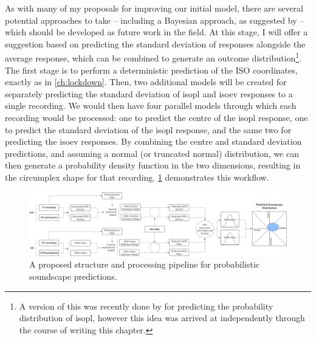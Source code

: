As with many of my proposals for improving our initial model, there are several potential approaches to take -- including a Bayesian approach, as suggested by \citet{Lionello2021Thesis} -- which should be developed as future work in the field. At this stage, I will offer a suggestion based on predicting the standard deviation of responses alongside the average response, which can be combined to generate an outcome distribution\footnote{A version of this was recently done by \citet{Ooi2022Probably} for predicting the probability distribution of \gls{isopl}, however this idea was arrived at independently through the course of writing this chapter.}. The first stage is to perform a deterministic prediction of the ISO coordinates, exactly as in \cref{ch:lockdown}. Then, two additional models will be created for separately predicting the standard deviation of \gls{isopl} and \gls{isoev} responses to a single recording. We would then have four parallel models through which each recording would be processed: one to predict the centre of the \gls{isopl} response, one to predict the standard deviation of the \gls{isopl} response, and the same two for predicting the \gls{isoev} responses. By combining the centre and standard deviation predictions, and assuming a normal (or truncated normal) distribution, we can then generate a probability density function in the two dimensions, resulting in the circumplex shape for that recording. \cref{fig:probPrediction} demonstrates this workflow.

\begin{figure}
  \centering
  \includegraphics{Figures/Probabilistic Soundscape Prediction.png}
  \caption{A proposed structure and processing pipeline for probabilistic soundscape predictions. \label{fig:probPrediction}}
\end{figure}

